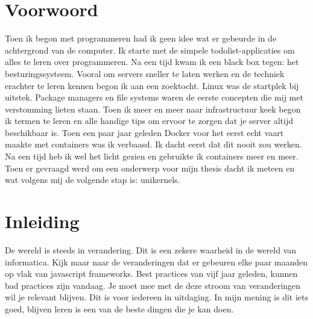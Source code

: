 \documentclass[pdftex,a4paper,12pt,twoside]{report}
\begin{document}
\begin{abstract}
  \lipsum[1-4]
\end{abstract}

\chapter*{Voorwoord}
\label{ch:voorwoord}

Toen ik begon met programmeren had ik geen idee wat er gebeurde in de achtergrond van de computer. Ik starte met de simpele todolist-applicaties om alles te leren over programmeren. Na een tijd kwam ik een black box tegen: het besturingssysteem. Vooral om servers sneller te laten werken en de techniek erachter te leren kennen begon ik aan een zoektocht. Linux was de startplek bij uitstek. Package managers en file systems waren de eerste concepten die mij met verstomming lieten staan. Toen ik meer en meer naar infrastructuur keek begon ik termen te leren en alle handige tips om ervoor te zorgen dat je server altijd beschikbaar is. Toen een paar jaar geleden Docker voor het eerst echt vaart maakte met containers was ik verbaasd. Ik dacht eerst dat dit nooit zou werken. Na een tijd heb ik wel het licht gezien en gebruikte ik containers meer en meer. Toen er gevraagd werd om een onderwerp voor mijn thesis dacht ik meteen en wat volgens mij de volgende stap is: unikernels.



\tableofcontents



\chapter{Inleiding}
\label{ch:inleiding}

De wereld is steeds in verandering. Dit is een zekere waarheid in de wereld van informatica. Kijk maar naar de veranderingen dat er gebeuren elke paar maanden op vlak van javascript frameworks. Best practices van vijf jaar geleden, kunnen bad practices zijn vandaag. Je moet mee met de deze stroom van veranderingen wil je relevant blijven. Dit is voor iedereen in uitdaging. In mijn mening is dit iets goed, blijven leren is een van de beste dingen die je kan doen.
\end{document}
